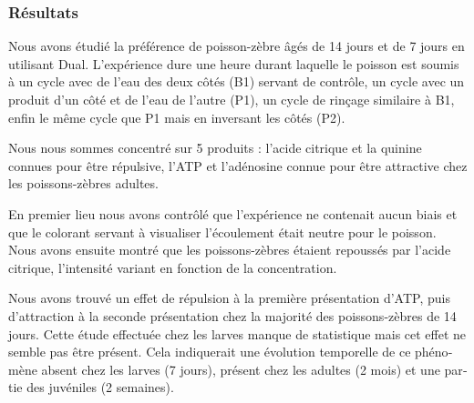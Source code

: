 \begin{otherlanguage}{french}
\subsubsection*{Résultats}
Nous avons étudié la préférence de poisson-zèbre âgés de 14 jours et de 7 jours en utilisant Dual. L'expérience dure une heure durant laquelle le poisson est soumis à un cycle avec de l'eau des deux côtés (B1) servant de contrôle, un cycle avec un produit d'un côté et de l'eau de l'autre (P1), un cycle de rinçage similaire à B1, enfin le même cycle que P1 mais en inversant les côtés (P2).

Nous nous sommes concentré sur 5 produits : l'acide citrique et la quinine connues pour être répulsive, l'ATP et l'adénosine connue pour être attractive chez les poissons-zèbres adultes.

En premier lieu nous avons contrôlé que l'expérience ne contenait aucun biais et que le colorant servant à visualiser l'écoulement était neutre pour le poisson. Nous avons ensuite montré que les poissons-zèbres étaient repoussés par l'acide citrique, l'intensité variant en fonction de la concentration.

Nous avons trouvé un effet de répulsion à la première présentation d'ATP, puis d'attraction à la seconde présentation chez la majorité des poissons-zèbres de 14 jours. Cette étude effectuée chez les larves manque de statistique mais cet effet ne semble pas être présent. Cela indiquerait une évolution temporelle de ce phénomène absent chez les larves (7 jours), présent chez les adultes (2 mois) et une partie des juvéniles (2 semaines).
\end{otherlanguage}
